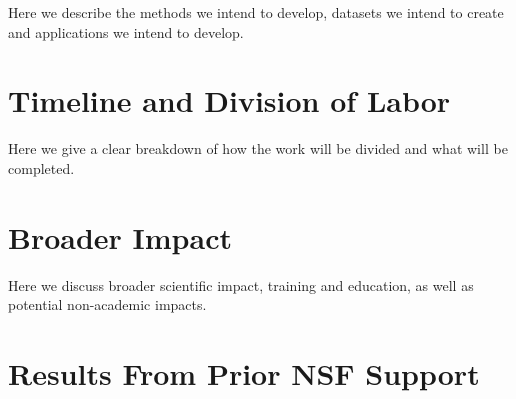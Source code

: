 Here we describe the methods we intend to develop, datasets we intend to create and applications we intend to develop.

\section{Timeline and Division of Labor}

Here we give a clear breakdown of how the work will be divided and what will be completed.

\section{Broader Impact}

Here we discuss broader scientific impact, training and education, as well as potential non-academic impacts.

\section{Results From Prior NSF Support}




